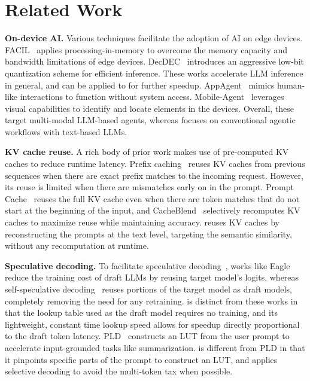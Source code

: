\section{Related Work} \label{sect:related_work}

{\bf On-device AI.}
Various techniques facilitate the adoption of AI on edge devices. FACIL~\cite{facil} applies processing-in-memory to overcome the memory capacity and bandwidth limitations of edge devices. DecDEC~\cite{decdec} introduces an aggressive low-bit quantization scheme for efficient inference. These works accelerate LLM inference in general, and can be applied to \proposed for further speedup. AppAgent~\cite{appagent} mimics human-like interactions to function without system access. Mobile-Agent~\cite{mobile_agent, mobile_agent_v2} leverages visual capabilities to identify and locate elements in the devices. Overall, these target multi-modal LLM-based agents, whereas \proposed focuses on conventional agentic workflows with text-based LLMs.


{\bf KV cache reuse.}
A rich body of prior work makes use of pre-computed KV caches to reduce runtime latency. Prefix caching~\cite{vllm} reuses KV caches from previous sequences when there are exact prefix matches to the incoming request. However, its reuse is limited when there are mismatches early on in the prompt. Prompt Cache~\cite{prompt_cache} reuses the full KV cache even when there are token matches that do not start at the beginning of the input, and CacheBlend~\cite{cacheblend} selectively recomputes KV caches to maximize reuse while maintaining accuracy. \proposed reuses KV caches by reconstructing the prompts at the text level, targeting the semantic similarity, without any recomputation at runtime.

{\bf Speculative decoding.} \label{page:related_work_specdec}
To facilitate speculative decoding~\cite{sps, specdec}, works like Eagle~\cite{eagle} reduce the training cost of draft LLMs by reusing target model's logits, whereas self-speculative decoding~\cite{draft_and_verify} reuses portions of the target model as draft models, completely removing the need for any retraining. \proposed is distinct from these works in that the lookup table used as the draft model requires no training, and its lightweight, constant time lookup speed allows for speedup directly proportional to the draft token latency. PLD~\cite{pld} constructs an LUT from the user prompt to accelerate input-grounded tasks like summarization. \proposed is different from PLD in that it pinpoints specific parts of the prompt to construct an LUT, and applies selective decoding to avoid the multi-token tax when possible.
